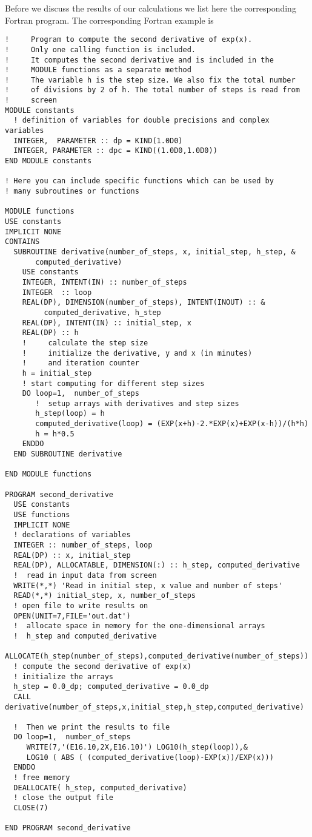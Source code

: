 Before we discuss the results of our calculations we list here the corresponding
Fortran program.
The corresponding Fortran  example is
\lstset{language=[90]Fortran}
\begin{lstlisting}[title={\url{http://folk.uio.no/mhjensen/compphys/programs/chapter03/Fortran/program1.f90}}]
!     Program to compute the second derivative of exp(x). 
!     Only one calling function is included.
!     It computes the second derivative and is included in the 
!     MODULE functions as a separate method
!     The variable h is the step size. We also fix the total number
!     of divisions by 2 of h. The total number of steps is read from
!     screen 
MODULE constants
  ! definition of variables for double precisions and complex variables
  INTEGER,  PARAMETER :: dp = KIND(1.0D0)
  INTEGER, PARAMETER :: dpc = KIND((1.0D0,1.0D0))
END MODULE constants

! Here you can include specific functions which can be used by
! many subroutines or functions

MODULE functions
USE constants
IMPLICIT NONE
CONTAINS
  SUBROUTINE derivative(number_of_steps, x, initial_step, h_step, &
       computed_derivative)
    USE constants
    INTEGER, INTENT(IN) :: number_of_steps
    INTEGER  :: loop
    REAL(DP), DIMENSION(number_of_steps), INTENT(INOUT) :: &
         computed_derivative, h_step
    REAL(DP), INTENT(IN) :: initial_step, x 
    REAL(DP) :: h
    !     calculate the step size  
    !     initialize the derivative, y and x (in minutes) 
    !     and iteration counter 
    h = initial_step
    ! start computing for different step sizes 
    DO loop=1,  number_of_steps
       !  setup arrays with derivatives and step sizes
       h_step(loop) = h
       computed_derivative(loop) = (EXP(x+h)-2.*EXP(x)+EXP(x-h))/(h*h)
       h = h*0.5
    ENDDO
  END SUBROUTINE derivative

END MODULE functions

PROGRAM second_derivative
  USE constants
  USE functions
  IMPLICIT NONE
  ! declarations of variables 
  INTEGER :: number_of_steps, loop
  REAL(DP) :: x, initial_step
  REAL(DP), ALLOCATABLE, DIMENSION(:) :: h_step, computed_derivative
  !  read in input data from screen 
  WRITE(*,*) 'Read in initial step, x value and number of steps'
  READ(*,*) initial_step, x, number_of_steps
  ! open file to write results on
  OPEN(UNIT=7,FILE='out.dat')
  !  allocate space in memory for the one-dimensional arrays  
  !  h_step and computed_derivative                           
  ALLOCATE(h_step(number_of_steps),computed_derivative(number_of_steps))
  ! compute the second derivative of exp(x)
  ! initialize the arrays
  h_step = 0.0_dp; computed_derivative = 0.0_dp 
  CALL  derivative(number_of_steps,x,initial_step,h_step,computed_derivative)

  !  Then we print the results to file  
  DO loop=1,  number_of_steps
     WRITE(7,'(E16.10,2X,E16.10)') LOG10(h_step(loop)),&
     LOG10 ( ABS ( (computed_derivative(loop)-EXP(x))/EXP(x)))
  ENDDO
  ! free memory
  DEALLOCATE( h_step, computed_derivative)
  ! close the output file
  CLOSE(7)
 
END PROGRAM second_derivative
\end{lstlisting}
